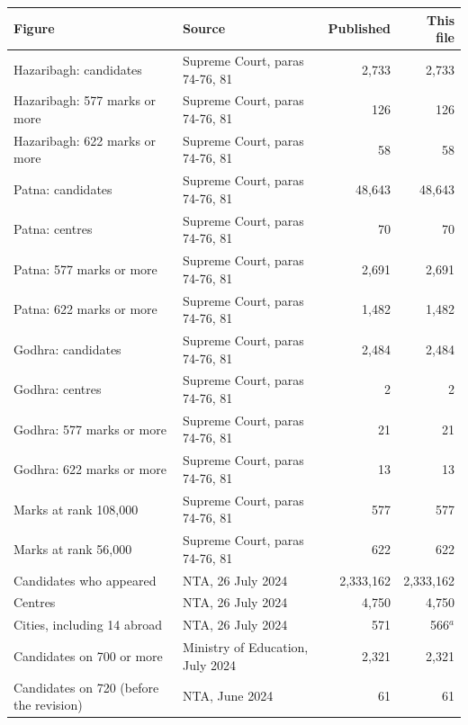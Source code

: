 {\small
\begin{tabular}{llrr}
\toprule
Figure & Source & Published & This file \\
\midrule
Hazaribagh: candidates & Supreme Court, paras 74-76, 81 & 2,733 & 2,733 \\
Hazaribagh: 577 marks or more & Supreme Court, paras 74-76, 81 & 126 & 126 \\
Hazaribagh: 622 marks or more & Supreme Court, paras 74-76, 81 & 58 & 58 \\
Patna: candidates & Supreme Court, paras 74-76, 81 & 48,643 & 48,643 \\
Patna: centres & Supreme Court, paras 74-76, 81 & 70 & 70 \\
Patna: 577 marks or more & Supreme Court, paras 74-76, 81 & 2,691 & 2,691 \\
Patna: 622 marks or more & Supreme Court, paras 74-76, 81 & 1,482 & 1,482 \\
Godhra: candidates & Supreme Court, paras 74-76, 81 & 2,484 & 2,484 \\
Godhra: centres & Supreme Court, paras 74-76, 81 & 2 & 2 \\
Godhra: 577 marks or more & Supreme Court, paras 74-76, 81 & 21 & 21 \\
Godhra: 622 marks or more & Supreme Court, paras 74-76, 81 & 13 & 13 \\
Marks at rank 108,000 & Supreme Court, paras 74-76, 81 & 577 & 577 \\
Marks at rank 56,000 & Supreme Court, paras 74-76, 81 & 622 & 622 \\
Candidates who appeared & NTA, 26 July 2024 & 2,333,162 & 2,333,162 \\
Centres & NTA, 26 July 2024 & 4,750 & 4,750 \\
Cities, including 14 abroad & NTA, 26 July 2024 & 571 & 566$^{a}$ \\
Candidates on 700 or more & Ministry of Education, July 2024 & 2,321 & 2,321 \\
Candidates on 720 (before the revision) & NTA, June 2024 & 61 & 61 \\
\bottomrule
\end{tabular}}
